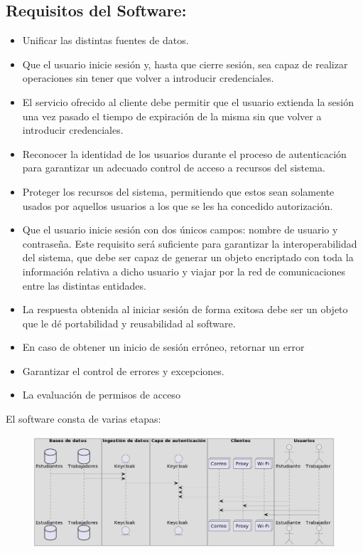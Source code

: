 \subsection*{Requisitos del Software:}
\begin{itemize}
	\item Unificar las distintas fuentes de datos.
	\item Que el usuario inicie sesión y, hasta que cierre sesión, sea capaz de realizar operaciones sin tener que volver a introducir credenciales. 
	\item El servicio ofrecido al cliente debe permitir que el usuario extienda la sesión una vez pasado el tiempo de expiración de la misma sin que volver a introducir credenciales. 
	\item Reconocer la identidad de los usuarios durante el proceso de autenticación para garantizar un adecuado control de acceso a recursos del sistema.
	\item Proteger los recursos del sistema, permitiendo que estos sean solamente usados por aquellos usuarios a los que se les ha concedido autorización.
	\item Que el usuario inicie sesión con dos únicos campos: nombre de usuario y contraseña. Este requisito será suficiente para garantizar la interoperabilidad del sistema, que debe ser capaz de generar un objeto encriptado con toda la información relativa a dicho usuario y viajar por la red de comunicaciones entre las distintas entidades. 
	\item  La respuesta obtenida al iniciar sesión de forma exitosa debe ser un objeto que le dé portabilidad y reusabilidad al software.
	\item En caso de obtener un inicio de sesión erróneo, retornar un error
	\item Garantizar el control de errores y excepciones.
	\item La evaluación de permisos de acceso
\end{itemize}

El software consta de varias etapas:

\begin{figure}[H]
	\centering
	\hspace*{-0.5in}
	\includegraphics[width=1.2\linewidth]{"Graphics/Diagrama Tesis"}
	\caption{}
	\label{fig:diagrama-tesis}
\end{figure}

